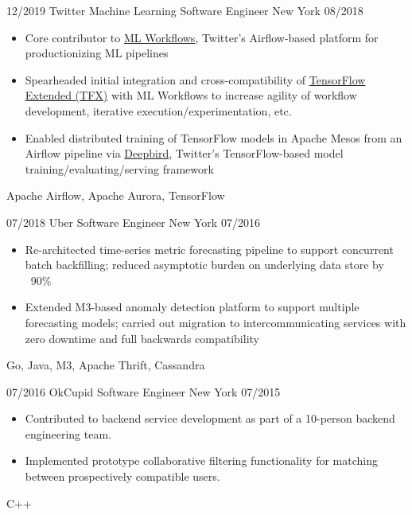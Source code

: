 \documentclass[alternative,10pt,compact]{yaac-another-awesome-cv}
\begin{document}
\begin{experiences}
  \emptySeparator

  \experience
      {12/2019}
      {Twitter}
      {Machine Learning Software Engineer}
      {New York}
      {08/2018}
      {
        \begin{itemize}
        \item Core contributor to
          \href{https://blog.twitter.com/engineering/en_us/topics/insights/2018/ml-workflows.html}{ML
            Workflows}, Twitter’s Airflow-based platform for productionizing ML
          pipelines
        \item
          Spearheaded initial integration and cross-compatibility of
          \href{http://tensorflow.org/tfx/}{TensorFlow Extended (TFX)} with ML
          Workflows to increase agility of workflow development, iterative
          execution/experimentation, etc.
        \item
          Enabled distributed training of TensorFlow models in Apache Mesos from
          an Airflow pipeline via
          \href{https://blog.twitter.com/engineering/en_us/topics/insights/2018/twittertensorflow.html}{Deepbird},
          Twitter’s TensorFlow-based model training/evaluating/serving framework
        \end{itemize}
      }
      {Apache Airflow, Apache Aurora, TensorFlow}

  \emptySeparator

  \experience
      {07/2018}
      {Uber}
      {Software Engineer}
      {New York}
      {07/2016}
      {
        \begin{itemize}
        \item
          Re-architected time-series metric forecasting pipeline to support
          concurrent batch backfilling; reduced asymptotic burden on underlying
          data store by ~90\%
        \item
          Extended M3-based anomaly detection platform to support multiple
          forecasting models; carried out migration to intercommunicating
          services with zero downtime and full backwards compatibility

        \end{itemize}
      }
      {Go, Java, M3, Apache Thrift, Cassandra}

  \emptySeparator

  \experience
      {07/2016}
      {OkCupid}
      {Software Engineer}
      {New York}
      {07/2015}
      {
        \begin{itemize}
        \item Contributed to backend service development as part of a 10-person
          backend engineering team.
        \item Implemented prototype collaborative filtering functionality for
          matching between prospectively compatible users.
        \end{itemize}

      }
      {C++}
\end{experiences}
\end{document}
